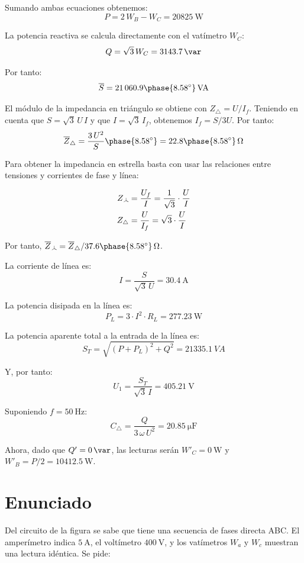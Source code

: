 Sumando ambas ecuaciones obtenemos:
\[
  P = 2 \,W_B - W_C = \SI{20825}{\watt}
\]

La potencia reactiva se calcula directamente con el vatímetro $W_C$:
\[
  Q = \sqrt{3} \, W_C = \SI{3143.7}{\var}
\]

Por tanto:
\[
  \overline{S} =
  21\,060.9\phase{\ang{8.58}}\,\unit{VA}
\]

El módulo de la impedancia en triángulo se obtiene con
$Z_{\triangle} = U / I_f$. Teniendo en cuenta que $S = \sqrt{3} \,U \,I$
y que $I = \sqrt{3} \,I_f$, obtenemos $I_f = S / 3U$. Por tanto:
\[
  \overline{Z}_{\triangle} = \frac{3 \, U^2}{S}\phase{\ang{8.58}} =
  {22.8\phase{\ang{8.58}}}\,\unit{\ohm}
\]


Para obtener la impedancia en estrella basta con usar las relaciones
entre tensiones y corrientes de fase y línea:

\vspace{-6mm}
\begin{align*}
  Z_{\wye} &= \frac{U_f}{I} = \frac{1}{\sqrt{3}} \cdot \frac{U}{I}\\
  Z_\triangle &= \frac{U}{I_f} = \sqrt{3} \cdot \frac{U}{I}
\end{align*}

Por tanto, $\overline{Z}_{\wye} = \overline{Z}_{\triangle} / 37.6\phase{\ang{8.58}}\,\unit{\ohm}$.

\vspace{3mm}
La corriente de línea es:
\[
  I = \frac{S}{\sqrt{3} \,U} = \SI{30.4}{\ampere}
\]

La potencia disipada en la línea es:
\[
  P_L = 3 \cdot I^2 \cdot R_L = \SI{277.23}{\watt}
\]

La potencia aparente total a la entrada de la línea es:
\[
  S_T = \sqrt{(P + P_L)^2 + Q^2} = \SI{21335.1}{VA}
\]

Y, por tanto:
\[
  U_1 = \frac{S_T}{\sqrt{3} \,I} = \SI{405.21}{\volt}
\]

Suponiendo $f = \SI{50}{\hertz}$:
\[
  C_{\triangle} = \frac{Q}{3 \,\omega \,U^2} = \SI{20.85}{\micro\farad}
\]

Ahora, dado que $Q' = \SI{0}{\var}$, las lecturas serán $W'_C = \SI{0}{\watt}$ y
$W'_B = P/2 = \SI{10412.5}{\watt}$.



\section{Enunciado}

Del circuito de la figura se sabe que tiene una secuencia de fases
directa ABC. El amperímetro indica $\SI{5}{\ampere}$, el voltímetro
$\SI{400}{\volt}$, y los vatímetros $W_a$ y $W_c$ muestran una lectura
idéntica. Se pide:

